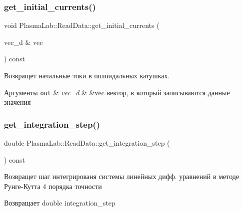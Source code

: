 \subsubsection{\texorpdfstring{get\+\_\+initial\+\_\+currents()}{get\_initial\_currents()}}
{\footnotesize\ttfamily void Plasma\+Lab\+::\+Read\+Data\+::get\+\_\+initial\+\_\+currents (\begin{DoxyParamCaption}\item[{vec\+\_\+d \&}]{vec }\end{DoxyParamCaption}) const\hspace{0.3cm}{\ttfamily [inline]}}

Возвращет начальные токи в полоидальных катушках. 
\begin{DoxyParams}[1]{Аргументы}
\mbox{\tt out}  & {\em vec\+\_\+d} & \&vec вектор, в который записываются данные значения \\
\hline
\end{DoxyParams}
\mbox{\label{class_plasma_lab_1_1_read_data_a3378ef0a72c05a949023647c62feaf82}} 
\subsubsection{\texorpdfstring{get\+\_\+integration\+\_\+step()}{get\_integration\_step()}}
{\footnotesize\ttfamily double Plasma\+Lab\+::\+Read\+Data\+::get\+\_\+integration\+\_\+step (\begin{DoxyParamCaption}{ }\end{DoxyParamCaption}) const\hspace{0.3cm}{\ttfamily [inline]}}

Возвращет шаг интегрированя системы линейных дифф. уравнений в методе Рунге-\/Кутта 4 порядка точности \begin{DoxyReturn}{Возвращает}
double integration\+\_\+step 
\end{DoxyReturn}
\mbox{\label{class_plasma_lab_1_1_read_data_aacd28b54bb8c16749867534823b41dd6}} 
